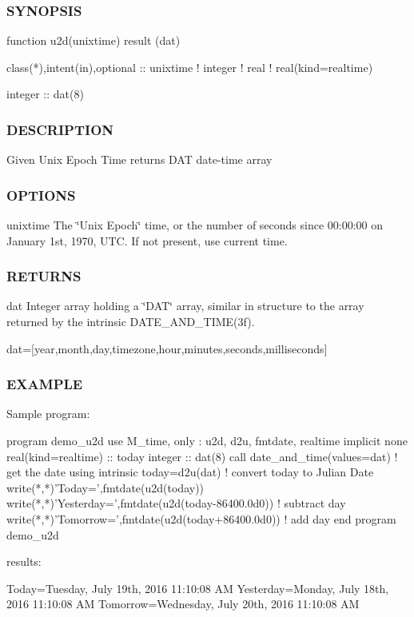 \subsubsection*{S\+Y\+N\+O\+P\+S\+IS}

\begin{DoxyVerb}function u2d(unixtime) result (dat)

 class(*),intent(in),optional      :: unixtime
 ! integer
 ! real
 ! real(kind=realtime)

 integer                           :: dat(8)
\end{DoxyVerb}


\subsubsection*{D\+E\+S\+C\+R\+I\+P\+T\+I\+ON}

Given Unix Epoch Time returns D\+AT date-\/time array

\subsubsection*{O\+P\+T\+I\+O\+NS}

unixtime The \char`\"{}\+Unix Epoch\char`\"{} time, or the number of seconds since 00\+:00\+:00 on January 1st, 1970, U\+TC. If not present, use current time.

\subsubsection*{R\+E\+T\+U\+R\+NS}

dat Integer array holding a \char`\"{}\+D\+A\+T\char`\"{} array, similar in structure to the array returned by the intrinsic D\+A\+T\+E\+\_\+\+A\+N\+D\+\_\+\+T\+I\+M\+E(3f).

dat=\mbox{[}year,month,day,timezone,hour,minutes,seconds,milliseconds\mbox{]}

\subsubsection*{E\+X\+A\+M\+P\+LE}

\begin{DoxyVerb}Sample program:

 program demo_u2d
 use M_time, only : u2d, d2u, fmtdate, realtime
 implicit none
 real(kind=realtime) :: today
 integer :: dat(8)
    call date_and_time(values=dat) ! get the date using intrinsic
    today=d2u(dat)                 ! convert today to Julian Date
    write(*,*)'Today=',fmtdate(u2d(today))
    write(*,*)'Yesterday=',fmtdate(u2d(today-86400.0d0)) ! subtract day
    write(*,*)'Tomorrow=',fmtdate(u2d(today+86400.0d0))  ! add day
 end program demo_u2d

results:

 Today=Tuesday, July 19th, 2016 11:10:08 AM
 Yesterday=Monday, July 18th, 2016 11:10:08 AM
 Tomorrow=Wednesday, July 20th, 2016 11:10:08 AM
\end{DoxyVerb}


